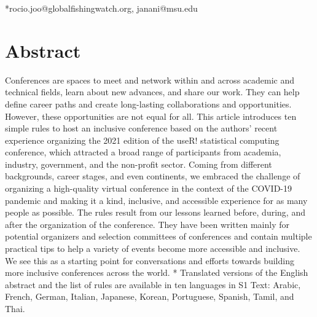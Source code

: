 \documentclass[10pt,letterpaper]{article}
\begin{document}
\begin{flushleft}



*rocio.joo@globalfishingwatch.org, janani@msu.edu

\end{flushleft}
\section*{Abstract}

Conferences are spaces to meet and network within and across academic and technical fields, learn about new advances, and share our work. They can help define career paths and create long-lasting collaborations and opportunities. 
However, these opportunities are not equal for all. 
This article introduces ten simple rules to host an inclusive conference based on the authors' recent experience organizing the 2021 edition of the useR! statistical computing conference, which attracted a broad range of participants from academia, industry, government, and the non-profit sector. 
Coming from different backgrounds, career stages, and even continents, we embraced the challenge of organizing a high-quality virtual conference in the context of the COVID-19 pandemic and making it a kind, inclusive, and accessible experience for as many people as possible.
The rules result from our lessons learned before, during, and after the organization of the conference. 
They have been written mainly for potential organizers and selection committees of conferences and contain multiple practical tips to help a variety of events become more accessible and inclusive. We see this as a starting point for conversations and efforts towards building more inclusive conferences across the world.
* Translated versions of the English abstract and the list of rules are available in ten languages in S1 Text: Arabic, French, German, Italian, Japanese, Korean, Portuguese, Spanish, Tamil, and Thai.
\end{document}
